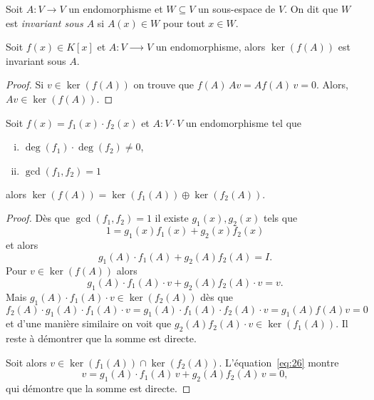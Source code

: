 \begin{definition}
  \label{def:35}
  Soit $A:V \rightarrow V$ un endomorphisme et $W \subseteq V$ un sous-espace de $V$. On dit que $W$ est \emph{invariant sous $A$} si $A(x) \in W$ pour tout $x \in W$. 
\end{definition}



\begin{lemma}
  \label{lem:20}
  Soit $f(x) ∈ K[x]$ et $A:V ⟶  V$ un endomorphisme,  alors $\ker(f(A))$ est invariant sous $A$. 
\end{lemma}


\begin{proof}
Si $v ∈ \ker(f(A))$ on trouve que $f(A)\,Av = Af(A)\,v = 0$. Alors, $Av ∈ \ker(f(A))$. 
\end{proof}


\begin{theorem}
  \label{thr:37}
  Soit $f(x) = f_1(x) \cdot f_2(x)$ et $A: V \cdot V$ un endomorphisme tel que 
  \begin{enumerate}[i)]
  \item $\deg(f_1) \cdot \deg(f_2) \neq 0$,
  \item $\gcd(f_1,f_2) = 1$ 
  \end{enumerate}
  alors 
  $
      \ker(f(A)) = \ker(f_1(A)) \oplus \ker(f_2(A)) 
   $.   
\end{theorem}
\begin{proof}
  Dès que $\gcd(f_1,f_2)=1$ il existe $g_1(x),g_2(x)$ tels que 
  \begin{displaymath}
    1 = g_1(x) f_1(x) + g_2(x) f_2(x)
  \end{displaymath}
  et alors 
  \begin{equation}
    \label{eq:26}   
    g_1(A) \cdot f_1(A) +  g_2(A) f_2(A) = I. 
  \end{equation}
  Pour $v \in \ker(f(A))$ alors 
\begin{displaymath}
   g_1(A) \cdot f_1(A) \cdot v  + g_2(A) f_2(A) \cdot v  = v. 
\end{displaymath}
Mais $g_1(A) \cdot f_1(A) \cdot v \in \ker(f_2(A))$  dès que 
\begin{displaymath}
  f_2(A) \cdot g_1(A) \cdot f_1(A) \cdot v =   g_1(A) \cdot f_1(A) ⋅ f_2(A) \cdot v = g_1(A) f(A) v = 0
\end{displaymath}
et d'une manière similaire on voit que $g_2(A) f_2(A) \cdot v \in \ker(f_1(A))$. Il reste à démontrer que la somme est directe. 

Soit alors $v ∈  \ker(f_1(A))  ∩  \ker(f_2(A))$.  L'équation~\eqref{eq:26} montre 
\begin{displaymath}
  v =  g_1(A) \cdot f_1(A) \, v+  g_2(A) f_2(A) \, v = 0,
\end{displaymath}
qui démontre que la somme est directe. 
\end{proof}






